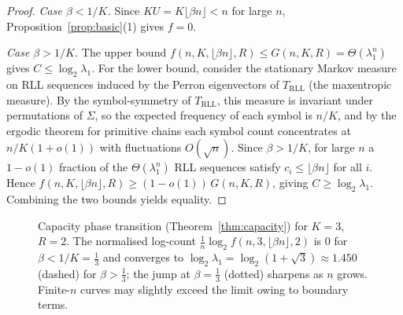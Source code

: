 \documentclass[a4paper,12pt]{article}
\begin{document}
\begin{proof}
\emph{Case $\beta<1/K$.} Since $KU=K\lfloor\beta n\rfloor<n$ for large
$n$, Proposition~\ref{prop:basic}(1) gives $f=0$.

\emph{Case $\beta>1/K$.} The upper bound
$f(n,K,\lfloor\beta n\rfloor,R)\le G(n,K,R)=\Theta(\lambda_1^n)$ gives
$C\le\log_2\lambda_1$.  For the lower bound, consider the stationary
Markov measure on RLL sequences induced by the Perron eigenvectors of
$T_{\mathrm{RLL}}$ (the maxentropic measure).  By the symbol-symmetry
of $T_{\mathrm{RLL}}$, this measure is invariant under permutations of
$\Sigma$, so the expected frequency of each symbol is $n/K$, and by the
ergodic theorem for primitive chains each symbol count concentrates at
$n/K(1+o(1))$ with fluctuations $O(\sqrt n)$.  Since $\beta>1/K$, for
large $n$ a $1-o(1)$ fraction of the $\Theta(\lambda_1^n)$ RLL
sequences satisfy $c_i\le\lfloor\beta n\rfloor$ for all $i$.  Hence
$f(n,K,\lfloor\beta n\rfloor,R)\ge(1-o(1))\,G(n,K,R)$, giving
$C\ge\log_2\lambda_1$.  Combining the two bounds yields equality.
\end{proof}

\begin{figure}[H]
\centering
{}
\caption{Capacity phase transition (Theorem~\ref{thm:capacity}) for
$K=3$, $R=2$. The normalised log-count
$\tfrac1n\log_2 f(n,3,\lfloor\beta n\rfloor,2)$ is $0$ for
$\beta<1/K=\tfrac13$ and converges to
$\log_2\lambda_1=\log_2(1{+}\sqrt3)\approx1.450$ (dashed) for
$\beta>\tfrac13$; the jump at $\beta=\tfrac13$ (dotted) sharpens as
$n$ grows. Finite-$n$ curves may slightly exceed the limit owing to
boundary terms.}
\label{fig:phase}
\end{figure}
\end{document}
